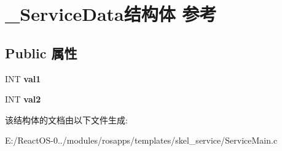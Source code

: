 \hypertarget{struct___service_data}{}\section{\+\_\+\+Service\+Data结构体 参考}
\label{struct___service_data}
\subsection*{Public 属性}
\begin{DoxyCompactItemize}
\item 
\mbox{\label{struct___service_data_aec7678d24ad1821fe4f646f53a5bcc79}} 
I\+NT {\bfseries val1}
\item 
\mbox{\label{struct___service_data_a7c312e0c57968f2d6ffb4c1e8f1b6c2f}} 
I\+NT {\bfseries val2}
\end{DoxyCompactItemize}


该结构体的文档由以下文件生成\+:\begin{DoxyCompactItemize}
\item 
E\+:/\+React\+O\+S-\/0../modules/rosapps/templates/skel\+\_\+service/Service\+Main.\+c\end{DoxyCompactItemize}
